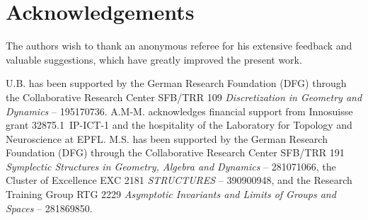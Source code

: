 
\section*{Acknowledgements}
The authors wish to thank an anonymous referee for his extensive feedback and valuable suggestions, which have greatly improved the present work.

U.B. has been supported by the German Research Foundation (DFG) through the Collaborative Research Center SFB/TRR 109 \emph{Discretization in Geometry and Dynamics} -- 195170736.
A.M-M. acknowledges financial support from Innosuisse grant \mbox{32875.1 IP-ICT-1} and the hospitality of the Laboratory for Topology and Neuroscience at EPFL.
M.S. has been supported by the German Research Foundation (DFG) through the Collaborative Research Center SFB/TRR 191 \emph{Symplectic Structures in Geometry, Algebra and Dynamics} -- 281071066, the Cluster of Excellence EXC 2181 \emph{STRUCTURES} -- 390900948, and the Research Training Group RTG 2229 \emph{Asymptotic Invariants and Limits of Groups and Spaces} -- 281869850.